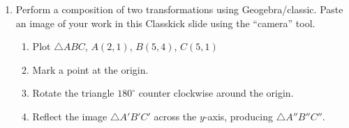 \documentclass[12pt, twoside]{article}
\begin{document}
\begin{enumerate}
\newpage
\item Perform a composition of two transformations using Geogebra/classic. Paste an image of your work in this Classkick slide using the ``camera'' tool.
  \begin{enumerate}
    \item Plot $\triangle ABC$, $A(2,1)$, $B(5,4)$, $C(5,1)$
    \item Mark a point at the origin.
    \item Rotate the triangle $180^\circ$ counter clockwise around the origin.
    \item Reflect the image $\triangle A'B'C'$ across the $y$-axis, producing $\triangle A''B''C''$.
  \end{enumerate}
    
\end{enumerate}
\end{document}
